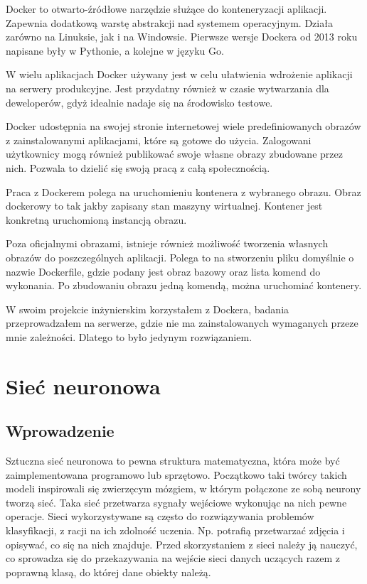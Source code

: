 \documentclass{report}
\begin{document}
    Docker to otwarto-źródłowe narzędzie służące do konteneryzacji aplikacji.
    Zapewnia dodatkową warstę abstrakcji nad systemem operacyjnym.
    Działa zarówno na Linuksie, jak i na Windowsie.
    Pierwsze wersje Dockera od 2013 roku napisane były w Pythonie, a kolejne w języku Go.

    W wielu aplikacjach Docker używany jest w celu ułatwienia wdrożenie aplikacji na serwery produkcyjne.
    Jest przydatny również w czasie wytwarzania dla deweloperów, gdyż idealnie nadaje się na środowisko testowe.

    Docker udostępnia na swojej stronie internetowej wiele predefiniowanych obrazów z zainstalowanymi aplikacjami, które są gotowe do użycia.
    Zalogowani użytkownicy mogą również publikować swoje własne obrazy zbudowane przez nich.
    Pozwala to dzielić się swoją pracą z całą społecznością.

    Praca z Dockerem polega na uruchomieniu kontenera z wybranego obrazu.
    Obraz dockerowy to tak jakby zapisany stan maszyny wirtualnej.
    Kontener jest konkretną uruchomioną instancją obrazu.

    Poza oficjalnymi obrazami, istnieje również możliwość tworzenia własnych obrazów do poszczególnych aplikacji.
    Polega to na stworzeniu pliku domyślnie o nazwie Dockerfile, gdzie podany jest obraz bazowy oraz lista komend do wykonania.
    Po zbudowaniu obrazu jedną komendą, można uruchomiać kontenery.

    W swoim projekcie inżynierskim korzystałem z Dockera, badania przeprowadzałem na serwerze, gdzie nie ma zainstalowanych wymaganych przeze mnie zależności.
    Dlatego to było jedynym rozwiązaniem.


    \chapter{Sieć neuronowa}\label{ch:siećNeuronowa}

    \section{Wprowadzenie}\label{sec:wprowadzenie}

    Sztuczna sieć neuronowa to pewna struktura matematyczna, która może być zaimplementowana programowo lub sprzętowo.
    Początkowo taki twórcy takich modeli inspirowali się zwierzęcym mózgiem, w którym połączone ze sobą neurony tworzą sieć.
    Taka sieć przetwarza sygnały wejściowe wykonując na nich pewne operacje.
    Sieci wykorzystywane są często do rozwiązywania problemów klasyfikacji, z racji na ich zdolność uczenia.
    Np. potrafią przetwarzać zdjęcia i opisywać, co się na nich znajduje.
    Przed skorzystaniem z sieci należy ją nauczyć, co sprowadza się do przekazywania na wejście sieci danych uczących razem z poprawną klasą, do której dane obiekty należą.
\end{document}
